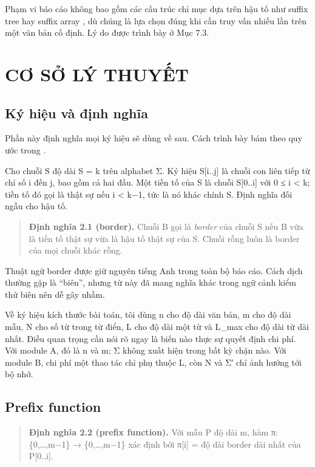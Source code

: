 Phạm vi báo cáo không bao gồm các cấu trúc chỉ mục dựa trên hậu tố như
suffix tree \cite{ukkonen1995} hay suffix array \cite{manber1993}, dù chúng là lựa chọn
đúng khi cần truy vấn nhiều lần trên một văn bản cố định. Lý do được
trình bày ở Mục 7.3.

\chapter{CƠ SỞ LÝ THUYẾT}
\label{ch:2}

\section{Ký hiệu và định nghĩa}
\label{sec:2-1}

Phần này định nghĩa mọi ký hiệu sẽ dùng về sau. Cách trình bày bám theo
quy ước trong \cite{cormen2022,gusfield1997}.

Cho chuỗi S độ dài \textbar S\textbar{} = k trên alphabet Σ. Ký hiệu
S{[}i..j{]} là chuỗi con liên tiếp từ chỉ số i đến j, bao gồm cả hai
đầu. Một tiền tố của S là chuỗi S{[}0..i{]} với 0 ≤ i \textless{} k;
tiền tố đó gọi là thật sự nếu i \textless{} k−1, tức là nó khác chính S.
Định nghĩa đối ngẫu cho hậu tố.

\begin{quote}
\textbf{Định nghĩa 2.1 (border).} Chuỗi B gọi là \emph{border} của chuỗi
S nếu B vừa là tiền tố thật sự vừa là hậu tố thật sự của S. Chuỗi rỗng
luôn là border của mọi chuỗi khác rỗng.
\end{quote}

Thuật ngữ border được giữ nguyên tiếng Anh trong toàn bộ báo cáo. Cách
dịch thường gặp là ``biên'', nhưng từ này đã mang nghĩa khác trong ngữ
cảnh kiểm thử biên nên dễ gây nhầm.

Về ký hiệu kích thước bài toán, tôi dùng n cho độ dài văn bản, m cho độ
dài mẫu, N cho số từ trong từ điển, L cho độ dài một từ và L\_max cho độ
dài từ dài nhất. Điều quan trọng cần nói rõ ngay là biến nào thực sự
quyết định chi phí. Với module A, đó là n và m; \textbar Σ\textbar{}
không xuất hiện trong bất kỳ chặn nào. Với module B, chi phí một thao
tác chỉ phụ thuộc L, còn N và \textbar Σ′\textbar{} chỉ ảnh hưởng tới bộ
nhớ.

\section{Prefix function}
\label{sec:2-2}

\begin{quote}
\textbf{Định nghĩa 2.2 (prefix function).} Với mẫu P độ dài m, hàm π:
\{0,\ldots,m−1\} → \{0,\ldots,m−1\} xác định bởi π{[}i{]} = độ dài
border dài nhất của P{[}0..i{]}.
\end{quote}

